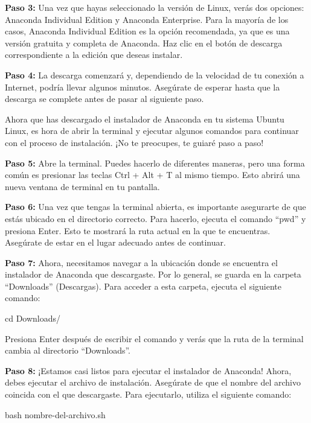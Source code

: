 \documentclass[
  a4paper,
]{article}
\newenvironment{Shaded}{}{}
\newcommand{\BuiltInTok}[1]{\textcolor[rgb]{0.84,0.23,0.29}{#1}}
\newcommand{\FunctionTok}[1]{\textcolor[rgb]{0.44,0.26,0.76}{#1}}
\newcommand{\NormalTok}[1]{\textcolor[rgb]{0.14,0.16,0.18}{#1}}
\begin{document}
\textbf{Paso 3:} Una vez que hayas seleccionado la versión de Linux,
verás dos opciones: Anaconda Individual Edition y Anaconda Enterprise.
Para la mayoría de los casos, Anaconda Individual Edition es la opción
recomendada, ya que es una versión gratuita y completa de Anaconda. Haz
clic en el botón de descarga correspondiente a la edición que deseas
instalar.

\textbf{Paso 4:} La descarga comenzará y, dependiendo de la velocidad de
tu conexión a Internet, podría llevar algunos minutos. Asegúrate de
esperar hasta que la descarga se complete antes de pasar al siguiente
paso.

Ahora que has descargado el instalador de Anaconda en tu sistema Ubuntu
Linux, es hora de abrir la terminal y ejecutar algunos comandos para
continuar con el proceso de instalación. ¡No te preocupes, te guiaré
paso a paso!

\textbf{Paso 5:} Abre la terminal. Puedes hacerlo de diferentes maneras,
pero una forma común es presionar las teclas Ctrl + Alt + T al mismo
tiempo. Esto abrirá una nueva ventana de terminal en tu pantalla.

\textbf{Paso 6:} Una vez que tengas la terminal abierta, es importante
asegurarte de que estás ubicado en el directorio correcto. Para hacerlo,
ejecuta el comando ``pwd'' y presiona Enter. Esto te mostrará la ruta
actual en la que te encuentras. Asegúrate de estar en el lugar adecuado
antes de continuar.

\textbf{Paso 7:} Ahora, necesitamos navegar a la ubicación donde se
encuentra el instalador de Anaconda que descargaste. Por lo general, se
guarda en la carpeta ``Downloads'' (Descargas). Para acceder a esta
carpeta, ejecuta el siguiente comando:

\begin{Shaded}
\begin{Highlighting}[]
\BuiltInTok{cd}\NormalTok{ Downloads/}
\end{Highlighting}
\end{Shaded}

Presiona Enter después de escribir el comando y verás que la ruta de la
terminal cambia al directorio ``Downloads''.

\textbf{Paso 8:} ¡Estamos casi listos para ejecutar el instalador de
Anaconda! Ahora, debes ejecutar el archivo de instalación. Asegúrate de
que el nombre del archivo coincida con el que descargaste. Para
ejecutarlo, utiliza el siguiente comando:

\begin{Shaded}
\begin{Highlighting}[]
\FunctionTok{bash}\NormalTok{ nombre{-}del{-}archivo.sh}
\end{Highlighting}
\end{Shaded}
\end{document}
